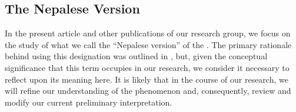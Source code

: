 \subsection{The Nepalese Version}

In the present article and other publications of our research group, we focus on the study of what we call the “Nepalese version” of the \SS. The primary rationale behind using this designation was outlined in \citet[2-3]{kleb-2021b}, but, given the conceptual significance that this term occupies in our research, we consider it necessary to reflect upon its meaning here. It is likely that in the course of our research, we will refine our understanding of the phenomenon and, consequently, review and modify our current preliminary interpretation.

